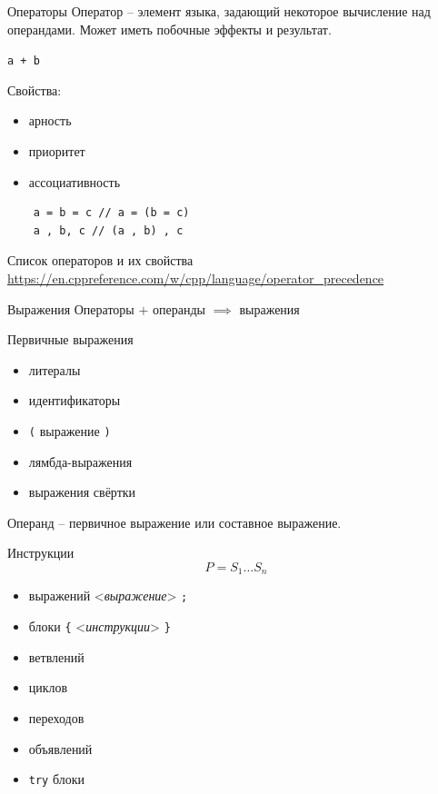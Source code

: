 \documentclass[unknownkeysallowed,xcolor=table]{beamer}
\begin{document}
\begin{frame}[fragile]{Операторы}
  Оператор -- элемент языка, задающий некоторое вычисление над операндами. Может иметь побочные эффекты и результат.

  \lstinline{a + b}

  Свойства:
  \begin{itemize}
    \item арность
    \item приоритет
    \item ассоциативность
  \end{itemize}
  \begin{lstlisting}
    a = b = c // a = (b = c)
    a , b, c // (a , b) , c
  \end{lstlisting}
\end{frame}

\begin{frame}{Список операторов и их свойства}
  \url{https://en.cppreference.com/w/cpp/language/operator_precedence}
\end{frame}

\begin{frame}[fragile]{Выражения}
  Операторы $+$ операнды $\implies$ выражения

  \vspace{1em}
  Первичные выражения
  \begin{itemize}
    \item литералы
    \item идентификаторы
    \item \lstinline{(} выражение \lstinline{)}
    \item лямбда-выражения
    \item выражения свёртки
  \end{itemize}

  \vspace{1em}
  Операнд -- первичное выражение или составное выражение.
\end{frame}

\begin{frame}[fragile]{Инструкции}
  \[
    P = S_1 \dotso S_n
  \]
  \begin{itemize}
    \item выражений <\emph{выражение}> \lstinline{;}
    \item блоки \lstinline|{| <\emph{инструкции}> \lstinline|}|
    \item ветвлений
    \item циклов
    \item переходов
    \item объявлений
    \item \lstinline{try} блоки
  \end{itemize}
\end{frame}
\end{document}
